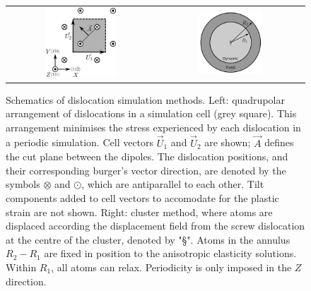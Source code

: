 \documentclass[a4paper,11pt]{article}
\begin{document}
        \begin{figure}
    \begin{tabular}{cc}
	     \includegraphics[width=0.5\textwidth]{Images/s_arrangement_quadrupole.png} &
             \includegraphics[width=0.45\textwidth]{Images/cluster_method_schematic.png}  \\
    \end{tabular}
\caption{Schematics of dislocation simulation methods. Left: quadrupolar arrangement of dislocations in a simulation cell (grey square). This arrangement  minimises the stress experienced by each dislocation in a periodic simulation. Cell vectors $\vec{U}_1$ and $\vec{U}_2$ are shown; $\vec{A}$ defines the cut plane between the dipoles. The dislocation positions, and their corresponding burger's vector direction, are denoted by the symbols $\otimes$ and $\odot$, which are antiparallel to each other. Tilt components added to cell vectors to accomodate for the plastic strain are not shown. Right: cluster method, where atoms are displaced according the displacement field from the screw dislocation at the centre of the cluster, denoted by "\S". Atoms in the annulus $R_2 - R_1$ are fixed in position to the anisotropic elasticity solutions. Within $R_1$, all atoms can relax. Periodicity is only imposed in the $Z$ direction.}
	\label{fig:dislocationschematics}
    \end{figure}
\end{document}
